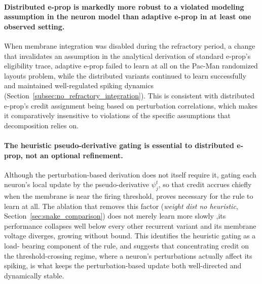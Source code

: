 \paragraph{Distributed e-prop is markedly more robust to a violated
modeling assumption in the neuron model than adaptive e-prop in at least one
observed setting.} When
membrane integration was disabled during the refractory period, a change
that invalidates an assumption in the analytical derivation of standard
e-prop's eligibility trace, adaptive e-prop failed to learn at all on the
Pac-Man randomized layouts problem, while the distributed variants
continued to learn successfully and maintained well-regulated spiking
dynamics (Section~\ref{subsec:no_refractory_integration}). This is consistent
with distributed e-prop's credit assignment being based on perturbation
correlations, which makes it comparatively insensitive to violations of the
specific assumptions that decomposition relies on.

\paragraph{The heuristic pseudo-derivative gating is essential to distributed e-prop, not an optional
refinement.} Although the perturbation-based derivation does not itself require it, gating each
neuron's local update by the pseudo-derivative $\psi^t_j$, so that credit accrues chiefly when the
membrane is near the firing threshold, proves necessary for the rule to learn at all. The ablation
that removes this factor (\emph{weight dist no heuristic}, Section~\ref{sec:snake_comparison}) does
not merely learn more slowly ,its performance collapses well below every other recurrent variant and
its membrane voltage diverges, growing without bound. This identifies the heuristic gating as a load-
bearing component of the rule, and suggests
that concentrating credit on the threshold-crossing regime, where a neuron's perturbations actually
affect its spiking, is what keeps the perturbation-based update both well-directed and dynamically
stable.

